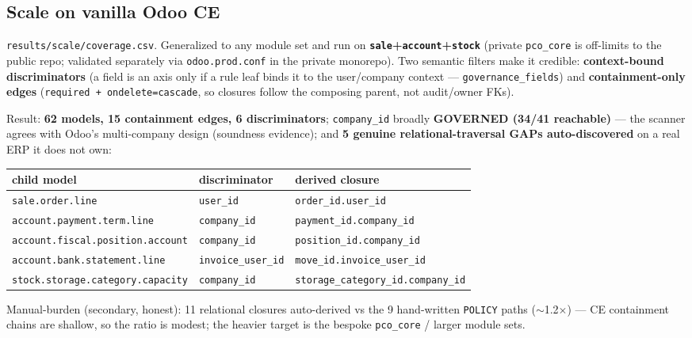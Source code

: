 \documentclass[11pt,a4paper]{article}
\newcommand{\code}[1]{\texttt{#1}}
\begin{document}
\subsection{Scale on vanilla Odoo CE}
\code{results/scale/coverage.csv}. Generalized to any module set and run on
\textbf{\code{sale}+\code{account}+\code{stock}} (private \code{pco_core} is off-limits to the public repo;
validated separately via \code{odoo.prod.conf} in the private monorepo). Two semantic filters make it credible:
\textbf{context-bound discriminators} (a field is an axis only if a rule leaf binds it to the user/company
context --- \code{governance_fields}) and \textbf{containment-only edges} (\code{required + ondelete=cascade},
so closures follow the composing parent, not audit/owner FKs).

Result: \textbf{62 models, 15 containment edges, 6 discriminators}; \code{company_id} broadly \textbf{GOVERNED
(34/41 reachable)} --- the scanner agrees with Odoo's multi-company design (soundness evidence); and \textbf{5
genuine relational-traversal GAPs auto-discovered} on a real ERP it does not own:

\begin{center}\small
\begin{tabular}{@{}lll@{}}
\toprule
child model & discriminator & derived closure \\
\midrule
\code{sale.order.line}                  & \code{user_id}          & \code{order_id.user_id} \\
\code{account.payment.term.line}        & \code{company_id}       & \code{payment_id.company_id} \\
\code{account.fiscal.position.account}  & \code{company_id}       & \code{position_id.company_id} \\
\code{account.bank.statement.line}      & \code{invoice_user_id}  & \code{move_id.invoice_user_id} \\
\code{stock.storage.category.capacity}  & \code{company_id}       & \code{storage_category_id.company_id} \\
\bottomrule
\end{tabular}
\end{center}

Manual-burden (secondary, honest): 11 relational closures auto-derived vs the 9 hand-written \code{POLICY}
paths ($\sim$1.2$\times$) --- CE containment chains are shallow, so the ratio is modest; the heavier target is
the bespoke \code{pco_core} / larger module sets.
\end{document}
